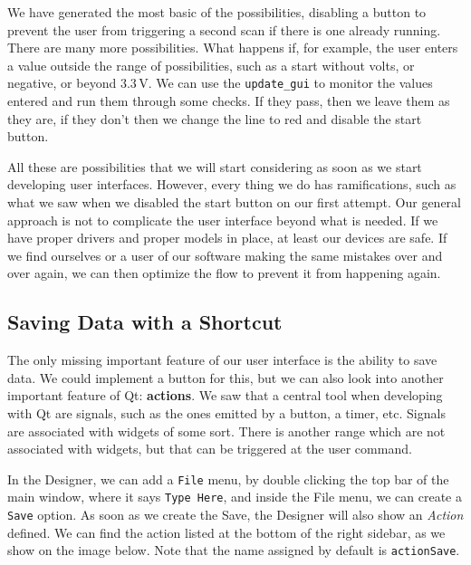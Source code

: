We have generated the most basic of the possibilities, disabling a button to prevent the user from triggering a second scan if there is one already running. There are many more possibilities. What happens if, for example, the user enters a value outside the range of possibilities, such as a start without volts, or negative, or beyond $3.3\,\textrm{V}$. We can use the \texttt{update\_gui} to monitor the values entered and run them through some checks. If they pass, then we leave them as they are, if they don't then we change the line to red and disable the start button.

All these are possibilities that we will start considering as soon as we start developing user interfaces. However, every thing we do has ramifications, such as what we saw when we disabled the start button on our first attempt. Our general approach is not to complicate the user interface beyond what is needed. If we have proper drivers and proper models in place, at least our devices are safe. If we find ourselves or a user of our software making the same mistakes over and over again, we can then optimize the flow to prevent it from happening again.

\subsection{Saving Data with a Shortcut}\label{subsec:saving-data-with-a-shortcut}
The only missing important feature of our user interface is the ability to save data. We could implement a button for this, but we can also look into another important feature of Qt: \textbf{actions}. We saw that a central tool when developing with Qt are signals, such as the ones emitted by a button, a timer, etc. Signals are associated with widgets of some sort. There is another range which are not associated with widgets, but that can be triggered at the user command.

In the Designer, we can add a \texttt{File} menu, by double clicking the top bar of the main window, where it says \texttt{Type Here}, and inside the File menu, we can create a \texttt{Save} option. As soon as we create the Save, the Designer will also show an \emph{Action} defined. We can find the action listed at the bottom of the right sidebar, as we show on the image below. Note that the name assigned by default is \texttt{actionSave}.

